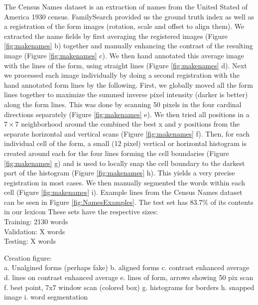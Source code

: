 \documentclass[ms,electronic,twosidetoc,letterpaper,chaptercenter,parttop,lol,lof,lot]{byumsphd}
\begin{document}
The Census Names dataset is an extraction of names from the United Stated of America 1930 census. FamilySearch provided us the ground truth index as well as a  registration of the form images (rotation, scale and offset to align them). We extracted the name fields by first averaging the registered images (Figure \ref{fig:makenames} b) together and manually enhancing the contrast of the resulting image (Figure \ref{fig:makenames} c). We then hand annotated this average image with the lines of the form, using straight lines (Figure \ref{fig:makenames} d). Next we processed each image individually by doing a second registration with the hand annotated form lines by the following. First, we globally moved all the form lines together to maximize the summed inverse pixel intensity (darker is better) along the form lines. This was done by scanning 50 pixels in the four cardinal directions separately (Figure \ref{fig:makenames} e). We then tried all positions in a $7\times 7$ neighborhood around the combined the best x and y positions from the separate horizontal and vertical scans (Figure \ref{fig:makenames} f).  Then, for each individual cell of the form, a small (12 pixel) vertical or horizontal histogram is created around each for the four lines forming the cell boundaries (Figure \ref{fig:makenames} g) and is used to locally snap the cell boundary to the darkest part of the histogram (Figure \ref{fig:makenames} h). This yields a very precise registration in most cases. We then manually segmented the words within each cell (Figure \ref{fig:makenames} i). 
Example lines from the Census Names dataset can be seen in Figure \ref{fig:NamesExamples}.
The test set has 83.7\% of its contents in our lexicon
These sets have the respective sizes:\\
\indent \indent Training: 2130 words\\
\indent \indent Validation: X words\\
\indent \indent Testing: X words

Creation figure:\\
a. Unalgined forms (perhaps fake)
b. aligned forms
c. contrast enhanced average
d. lines on contrast enhanced average
e. lines of form, arrows showing 50 pix scan
f. best point, 7x7 window scan (colored box)
g. histograms for borders
h. snapped image
i. word segmentation
\end{document}
